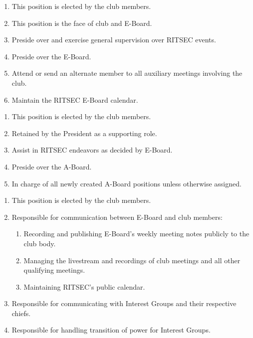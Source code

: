
\begin{enumerate}
	\item This position is elected by the club members.
	\item This position is the face of club and E-Board.
	\item Preside over and exercise general supervision over RITSEC events.
	\item Preside over the E-Board.
	\item Attend or send an alternate member to all auxiliary meetings involving the
	      club.
	\item Maintain the RITSEC E-Board calendar.
\end{enumerate}


\begin{enumerate}
	\item This position is elected by the club members.
	\item Retained by the President as a supporting role.
	\item Assist in RITSEC endeavors as decided by E-Board.
	\item Preside over the A-Board.
	\item In charge of all newly created A-Board positions unless otherwise assigned.
\end{enumerate}


\begin{enumerate}
	\item This position is elected by the club members.
	\item Responsible for communication between E-Board and club members:
	      \begin{enumerate}
		      \item Recording and publishing E-Board's weekly meeting notes publicly to the club
		            body.
		      \item Managing the livestream and recordings of club meetings and all other
		            qualifying meetings.
		      \item Maintaining RITSEC's public calendar.
	      \end{enumerate}
	\item Responsible for communicating with Interest Groups and their
	      respective chiefs.
	\item Responsible for handling transition of power for Interest Groups.
\end{enumerate}

